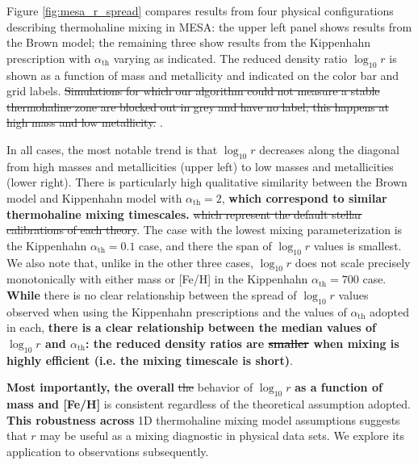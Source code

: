 %
%
Figure \ref{fig:mesa_r_spread} compares results from four physical configurations describing thermohaline mixing in MESA: the upper left panel shows results from the Brown model; the remaining three show results from the Kippenhahn prescription with $\alpha_{\text{th}}$ varying as indicated. The reduced density ratio $\log_{10} r$ is shown as a function of mass and metallicity and indicated on the color bar and grid labels.
\sout{Simulations for which our algorithm could not measure a stable thermohaline zone are blocked out in grey and have no label; this happens at high mass and low metallicity.} .
%

In all cases, the most notable trend is that $\log_{10} r$ decreases along the diagonal from high masses and metallicities (upper left) to low masses and metallicities (lower right). 
There is particularly high qualitative similarity between the Brown model and Kippenhahn model with $\alpha_{\text{th}} = 2$, \textbf{which correspond to similar thermohaline mixing timescales.} \sout{which represent the default stellar calibrations of each theory}. 
The case with the lowest mixing parameterization is the Kippenhahn $\alpha_{\text{th}} = 0.1$ case, and there the span of $\log_{10} r$ values is smallest. We also note that, unlike in the other three cases, $\log_{10} r$ does not scale precisely monotonically with either mass or [Fe/H] in the Kippenhahn $\alpha_{\text{th}} = 700$ case. \textbf{While} there is no clear relationship between the spread of $\log_{10} r$ values observed when using the Kippenhahn prescriptions and the values of $\alpha_{\text{th}}$ adopted in each, \textbf{there is a clear relationship between the median values of $\log_{10} r$ and $\alpha_{\text{th}}$: the reduced density ratios are \sout{smaller} when mixing is highly efficient (i.e. the mixing timescale is short)}. 
%

\textbf{Most importantly, the overall} \sout{the} behavior of $\log_{10} r$ \textbf{as a function of mass and [Fe/H]} is consistent regardless of the theoretical assumption adopted.
%
\textbf{This robustness across} 1D thermohaline mixing model assumptions suggests that $r$ may be useful as a mixing diagnostic in physical data sets. We explore its application to observations subsequently.


